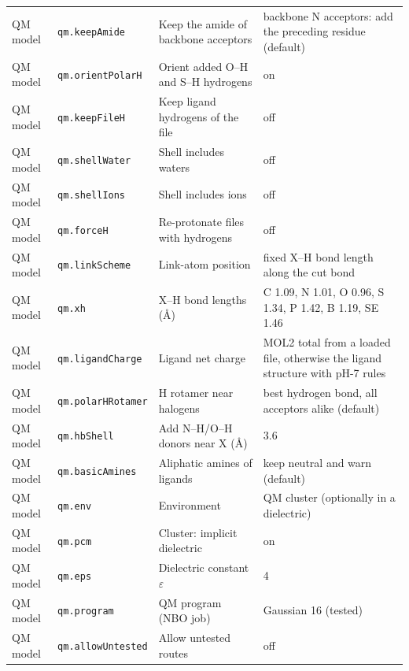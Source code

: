 {\begin{longtable}{llp{4.2cm}l}
QM model & \texttt{qm.keepAmide} & Keep the amide of backbone acceptors & \parbox[t]{5.0cm}{\raggedright backbone N acceptors: add the preceding residue (default)}\\
QM model & \texttt{qm.orientPolarH} & Orient added O--H and S--H hydrogens & \parbox[t]{5.0cm}{\raggedright on}\\
QM model & \texttt{qm.keepFileH} & Keep ligand hydrogens of the file & \parbox[t]{5.0cm}{\raggedright off}\\
QM model & \texttt{qm.shellWater} & Shell includes waters & \parbox[t]{5.0cm}{\raggedright off}\\
QM model & \texttt{qm.shellIons} & Shell includes ions & \parbox[t]{5.0cm}{\raggedright off}\\
QM model & \texttt{qm.forceH} & Re-protonate files with hydrogens & \parbox[t]{5.0cm}{\raggedright off}\\
QM model & \texttt{qm.linkScheme} & Link-atom position & \parbox[t]{5.0cm}{\raggedright fixed X--H bond length along the cut bond}\\
QM model & \texttt{qm.xh} & X--H bond lengths (\AA{}) & \parbox[t]{5.0cm}{\raggedright C 1.09, N 1.01, O 0.96, S 1.34, P 1.42, B 1.19, SE 1.46}\\
QM model & \texttt{qm.ligandCharge} & Ligand net charge & \parbox[t]{5.0cm}{\raggedright MOL2 total from a loaded file, otherwise the ligand structure with pH-7 rules}\\
QM model & \texttt{qm.polarHRotamer} & H rotamer near halogens & \parbox[t]{5.0cm}{\raggedright best hydrogen bond, all acceptors alike (default)}\\
QM model & \texttt{qm.hbShell} & Add N--H/O--H donors near X (\AA{}) & \parbox[t]{5.0cm}{\raggedright 3.6}\\
QM model & \texttt{qm.basicAmines} & Aliphatic amines of ligands & \parbox[t]{5.0cm}{\raggedright keep neutral and warn (default)}\\
QM model & \texttt{qm.env} & Environment & \parbox[t]{5.0cm}{\raggedright QM cluster (optionally in a dielectric)}\\
QM model & \texttt{qm.pcm} & Cluster: implicit dielectric & \parbox[t]{5.0cm}{\raggedright on}\\
QM model & \texttt{qm.eps} & Dielectric constant $\varepsilon$ & \parbox[t]{5.0cm}{\raggedright 4}\\
QM model & \texttt{qm.program} & QM program (NBO job) & \parbox[t]{5.0cm}{\raggedright Gaussian 16 (tested)}\\
QM model & \texttt{qm.allowUntested} & Allow untested routes & \parbox[t]{5.0cm}{\raggedright off}\\

\end{longtable}}
